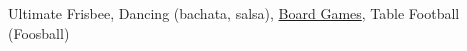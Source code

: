 \documentclass[10pt,a4paper,sans]{moderncv}        %
\begin{document}
Ultimate Frisbee, Dancing (bachata, salsa), \href{https://boardgamearena.com/player?section=prestige}{Board Games}, Table Football (Foosball)



% 


\end{document}
